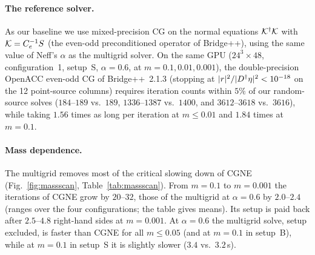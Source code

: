 \paragraph{The reference solver.} As our baseline we use mixed-precision CG on the normal equations
$\mathcal K^{\dagger}\mathcal K$ with $\mathcal K=C_{e}^{-1}S$ (the even-odd preconditioned operator of
Bridge++), using the same value of Neff's $\alpha$ as the multigrid solver.
On the same
GPU ($24^3\times48$, configuration~1, setup~S, $\alpha=0.6$, at $m=0.1, 0.01, 0.001$), the
double-precision OpenACC even-odd CG of Bridge++~2.1.3 (stopping at $|r|^2/|D^{\dagger}\eta|^2<10^{-18}$
on the 12 point-source columns) requires iteration counts within $5\%$ of our random-source solves
($184$--$189$ vs.\ $189$, $1336$--$1387$ vs.\ $1400$, and $3612$--$3618$ vs.\ $3616$), while taking
$1.56$ times as long per iteration at $m\le0.01$ and $1.84$ times at $m=0.1$.

\paragraph{Mass dependence.} The multigrid removes most of the critical slowing down of CGNE
(Fig.~\ref{fig:massscan}, Table~\ref{tab:massscan}). From $m=0.1$ to $m=0.001$ the iterations of
CGNE grow by $20$--$32$, those of the multigrid at $\alpha=0.6$ by $2.0$--$2.4$ \New (ranges over
the four configurations; the table gives means). Its setup is paid back after
$2.5$--$4.8$ right-hand sides at $m=0.001$. At $\alpha=0.6$ the multigrid solve, setup excluded, is
faster than CGNE for all $m\le0.05$ (and at $m=0.1$ in setup~B), while at $m=0.1$ in setup~S it is
slightly slower ($3.4$ vs.\ $3.2$\,s).

